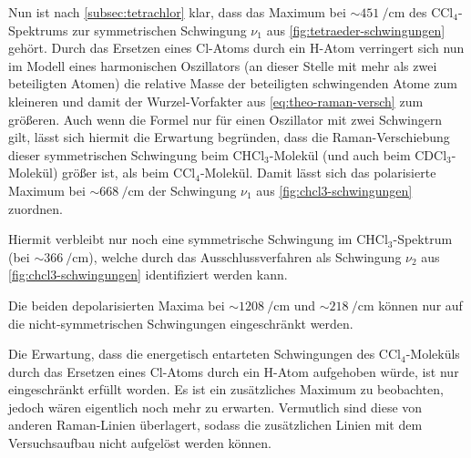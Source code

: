 \documentclass[../bericht.tex]{subfiles}
\begin{document}
        Nun ist nach \cref{subsec:tetrachlor} klar, dass das Maximum bei $\sim\SI{451}{\per\centi\meter}$ des $\mathrm{CCl_4}$-Spektrums zur symmetrischen Schwingung $\nu_1$ aus \cref{fig:tetraeder-schwingungen} gehört. Durch das Ersetzen eines Cl-Atoms durch ein H-Atom verringert sich nun im Modell eines harmonischen Oszillators (an dieser Stelle mit mehr als zwei beteiligten Atomen) die relative Masse der beteiligten schwingenden Atome zum kleineren und damit der Wurzel-Vorfakter aus \cref{eq:theo-raman-versch} zum größeren. Auch wenn die Formel nur für einen Oszillator mit zwei Schwingern gilt, lässt sich hiermit die Erwartung begründen, dass die Raman-Verschiebung dieser symmetrischen Schwingung beim $\mathrm{CHCl_3}$-Molekül (und auch beim $\mathrm{CDCl_3}$-Molekül) größer ist, als beim $\mathrm{CCl_4}$-Molekül. Damit lässt sich das polarisierte Maximum bei $\sim\SI{668}{\per\centi\meter}$ der Schwingung $\nu_1$ aus \cref{fig:chcl3-schwingungen} zuordnen.

        Hiermit verbleibt nur noch eine symmetrische Schwingung im $\mathrm{CHCl_3}$-Spektrum (bei $\sim\SI{366}{\per\centi\meter}$), welche durch das Ausschlussverfahren als Schwingung $\nu_2$ aus \cref{fig:chcl3-schwingungen} identifiziert werden kann.

        Die beiden depolarisierten Maxima bei $\sim\SI{1208}{\per\centi\meter}$ und $\sim\SI{218}{\per\centi\meter}$ können nur auf die nicht-symmetrischen Schwingungen eingeschränkt werden.

        Die Erwartung, dass die energetisch entarteten Schwingungen des $\mathrm{CCl_4}$-Moleküls durch das Ersetzen eines Cl-Atoms durch ein H-Atom aufgehoben würde, ist nur eingeschränkt erfüllt worden. Es ist ein zusätzliches Maximum zu beobachten, jedoch wären eigentlich noch mehr zu erwarten. Vermutlich sind diese von anderen Raman-Linien überlagert, sodass die zusätzlichen Linien mit dem Versuchsaufbau nicht aufgelöst werden können.
        \medskip
\end{document}
